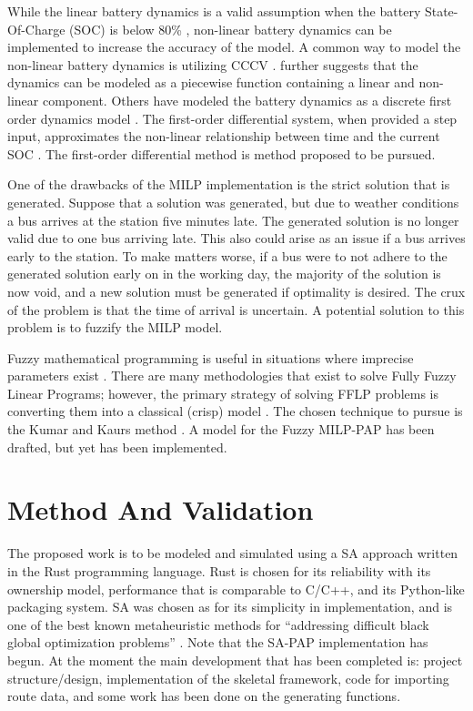 \documentclass[ee,msthesis]{usuthesis}
\begin{document}
While the linear battery dynamics is a valid assumption when the battery State-Of-Charge (SOC) is below 80\%
\cite{liu-2020-batter-elect}, non-linear battery dynamics can be implemented to increase the accuracy of the model. A
common way to model the non-linear battery dynamics is utilizing CCCV \cite{abdollahi-2016-optim-batter,chen-2008-desig-grey}. \cite{zhang-2021-optim-elect} further suggests that the dynamics can be modeled as a piecewise
function containing a linear and non-linear component. Others have modeled the battery dynamics as a discrete first
order dynamics model \cite{whitaker-2022-a-network}. The first-order differential system, when provided a step input,
approximates the non-linear relationship between time and the current SOC \cite{whitaker-2022-a-network}. The
first-order differential method is method proposed to be pursued.

One of the drawbacks of the MILP implementation is the strict solution that is generated. Suppose that a solution was
generated, but due to weather conditions a bus arrives at the station five minutes late. The generated solution is no
longer valid due to one bus arriving late. This also could arise as an issue if a bus arrives early to the station. To
make matters worse, if a bus were to not adhere to the generated solution early on in the working day, the majority of
the solution is now void, and a new solution must be generated if optimality is desired. The crux of the problem is that
the time of arrival is uncertain. A potential solution to this problem is to fuzzify the MILP model.

Fuzzy mathematical programming is useful in situations where imprecise parameters exist \cite{bello-2019-fuzzy-activ}.
There are many methodologies that exist to solve Fully Fuzzy Linear Programs; however, the primary strategy of solving
FFLP problems is converting them into a classical (crisp) model
\cite{bello-2019-fuzzy-activ,nasseri-2013-fully,kaur-2016-introd-fuzzy}. The chosen technique to pursue is the Kumar
and Kaurs method \cite{kaur-2016-introd-fuzzy}. A model for the Fuzzy MILP-PAP has been drafted, but yet has been
implemented.

\section{Method And Validation}
\label{sec:org12eb341}
The proposed work is to be modeled and simulated using a SA approach written in the Rust programming language. Rust is
chosen for its reliability with its ownership model, performance that is comparable to C/C++, and its Python-like
packaging system. SA was chosen as for its simplicity in implementation, and is one of the best known metaheuristic
methods for ``addressing difficult black global optimization problems'' \cite{delahaye-2019-simul}. Note that the SA-PAP
implementation has begun. At the moment the main development that has been completed is: project structure/design,
implementation of the skeletal framework, code for importing route data, and some work has been done on the generating
functions.
\end{document}
